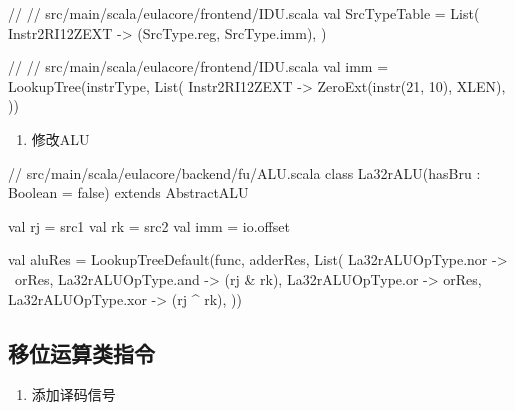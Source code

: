 \begin{CodeBlock}[language=BookScala]
// // src/main/scala/eulacore/frontend/IDU.scala
 val SrcTypeTable = List(
    Instr2RI12ZEXT -> (SrcType.reg, SrcType.imm),
  )
\end{CodeBlock}

\begin{CodeBlock}[language=BookScala]
// // src/main/scala/eulacore/frontend/IDU.scala
val imm = LookupTree(instrType, List(
    Instr2RI12ZEXT -> ZeroExt(instr(21, 10), XLEN),
  ))
\end{CodeBlock}

\begin{enumerate}
\def\labelenumi{\arabic{enumi}.}
\setcounter{enumi}{1}
\tightlist
\item
  修改ALU
\end{enumerate}

\begin{CodeBlock}[language=BookScala]
// src/main/scala/eulacore/backend/fu/ALU.scala
class La32rALU(hasBru : Boolean = false) extends AbstractALU {

  val rj = src1
  val rk = src2
  val imm = io.offset

  val aluRes = LookupTreeDefault(func, adderRes, List(
      La32rALUOpType.nor   -> ~orRes,
      La32rALUOpType.and   -> (rj & rk),
      La32rALUOpType.or    -> orRes,
      La32rALUOpType.xor   -> (rj ^ rk),
  ))
}
\end{CodeBlock}

\subsection{移位运算类指令}\label{sec:06-more-instructions-005}

\begin{enumerate}
\def\labelenumi{\arabic{enumi}.}
\tightlist
\item
  添加译码信号
\end{enumerate}

